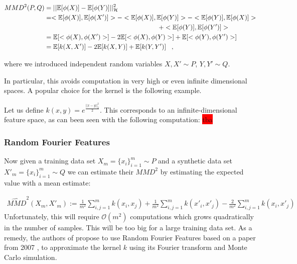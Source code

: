 \begin{align}
    MMD^2(P,Q) &= || \mathbb{E}[\phi(X)] - \mathbb{E}[\phi(Y)] ||^2_\mathcal{H} \nonumber \\
    &= <\mathbb{E}[\phi(X)], \mathbb{E}[\phi(X')]> - <\mathbb{E}[\phi(X)], \mathbb{E}[\phi(Y)]> - <\mathbb{E}[\phi(Y)], \mathbb{E}[\phi(X)]> \nonumber \\ &\phantom{mmmmmmmmmmmmmmmmmmmm}+ <\mathbb{E}[\phi(Y)], \mathbb{E}[\phi(Y')]> \nonumber \\
    &= \mathbb{E}[<\phi(X), \phi(X')>] - 2 \mathbb{E}[<\phi(X), \phi(Y)>] + \mathbb{E}[<\phi(Y), \phi(Y')>] \nonumber \\
    &= \mathbb{E}[k(X,X')] - 2 \mathbb{E}[k(X,Y)] + \mathbb{E}[k(Y,Y')] \;\;\;,
\end{align}

where we introduced independent random variables $X,X' \sim P$, $Y,Y' \sim Q$.

In particular, this avoids computation in very high or even infinite dimensional spaces. A popular choice for the kernel is the following example.

\begin{ex}
    Let us define $k(x,y)=e^{\frac{||x-y||^2_2}{2}}$. This corresponds to an infinite-dimensional feature space, as can been seen with the following computation:
    \colorbox{red}{tba}
\end{ex}

\subsubsection{Random Fourier Features}

Now given a training data set $X_m = \{x_i\}_{i=1}^m \sim P$ and a synthetic data set $X'_m = \{x_i\}_{i=1}^m \sim Q$ we can estimate their $MMD^2$ by estimating the expected value with a mean estimate:

\begin{align} \label{eq:mmd}
    \widehat{MMD}^2(X_m, X'_m) := \frac{1}{m^2} \sum_{i,j=1}^m k(x_i,x_j) + \frac{1}{m^2} \sum_{i,j=1}^m k(x'_i,x'_j) - \frac{2}{m^2} \sum_{i,j=1}^m k(x_i,x'_j)
\end{align}
Unfortunately, this will require $\mathcal{O}(m^2)$ computations which grows quadratically in the number of samples. This will be too big for a large training data set. As a remedy, the authors of \parencite{dpmerf} propose to use Random Fourier Features based on a paper from 2007 \parencite[see][]{rff}, to approximate the kernel $k$ using its Fourier transform and Monte Carlo simulation.

